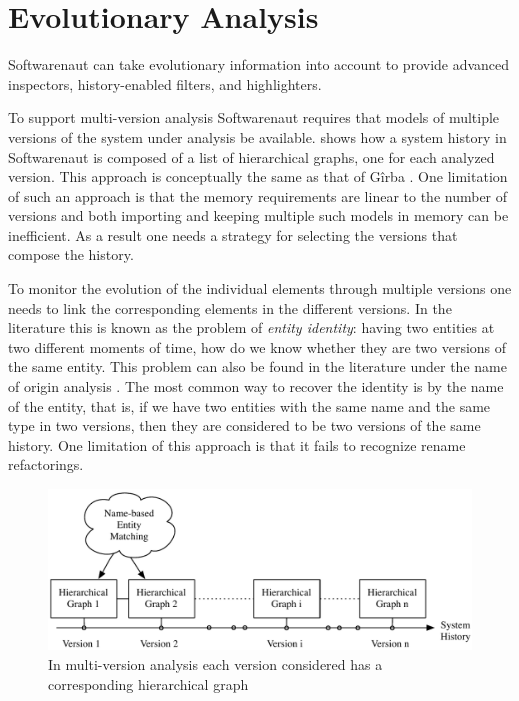 \documentclass[preprint,12pt]{elsarticle}
\begin{document}
\section {Evolutionary Analysis} 

Softwarenaut can take evolutionary information into account to provide advanced inspectors, history-enabled filters, and highlighters.


To support multi-version analysis Softwarenaut requires that models of multiple versions of the system under analysis be available.  shows how a system history in Softwarenaut is composed of a list of hierarchical graphs, one for each analyzed version. This approach is conceptually the same as that of G{\^i}rba \cite{girba-thesis}. One limitation of such an approach is that the memory requirements are linear to the number of versions and both importing and keeping multiple such models in memory can be inefficient. As a result one needs a strategy for selecting the versions that compose the history.

To monitor the evolution of the individual elements through multiple versions one needs to link the corresponding elements in the different versions. In the literature this is known as the problem of {\em entity identity}: having two entities at two different moments of time, how do we know whether they are two versions of the same entity. This problem can also be found in the literature under the name of origin analysis \cite{antoniol-discontinuities}. The most common way to recover the identity is by the name of the entity, that is, if we have two entities with the same name and the same type in two versions, then they are considered to be two versions of the same history. One limitation of this approach is that it fails to recognize rename refactorings. 


\begin{figure}[ht]
\begin{center}
\includegraphics[width=\linewidth]{images/MultiVersionAnalysis}
\caption{In multi-version analysis each version considered has a corresponding hierarchical graph}
\end{center}
\end{figure}
\end{document}
